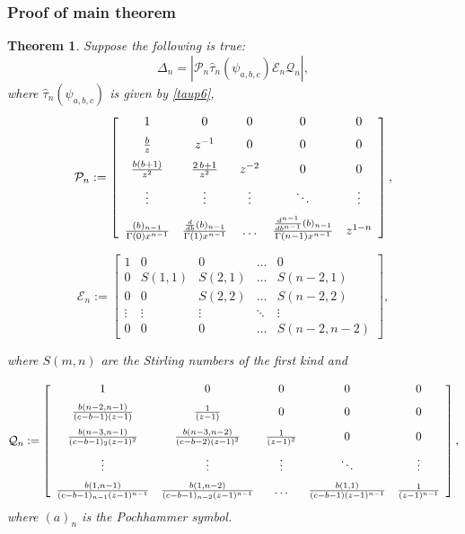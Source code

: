 \documentclass[12pt]{article}
\newtheorem{mydef}{Theorem}[section]
\numberwithin{figure}{section}
\numberwithin{equation}{section}
\numberwithin{table}{section}
\begin{document}
\subsubsection{Proof of main theorem}
\begin{mydef}
Suppose the following is true:
\begin{equation}
\Delta_n=|\mathcal{P}_n\hat\tau_n(\psi_{a,b,c})\mathcal{E}_n\mathcal{Q}_n|,\label{POMT}
\end{equation}
where $\hat\tau_n(\psi_{a,b,c})$ is given by \eqref{taup6},
$$
\mathcal{P}_n:=\left[ \begin {array}{ccccc} 1&0&0&0&0\\ \noalign{\medskip}{\frac {b}{z}
}&{z}^{-1}&0&0&0\\ \noalign{\medskip}{\frac {b \left( b+1 \right) }{{z}^
{2}}}&{\frac {2\,b+1}{{z}^{2}}}&{z}^{-2}&0&0\\ \noalign{\medskip}{\vdots}&\vdots&\vdots&\ddots&\vdots\\ \noalign{\medskip}{\frac{(b)_{n-1}}{\Gamma(0)x^{n-1}}}&\frac{\frac{d}{db}(b)_{n-1}}{\Gamma(1)x^{n-1}}&\hdots&\frac{\frac{d^{n-1}}{db^{n-1}}(b)_{n-1}}{\Gamma(n-1)x^{n-1}}&z^{1-n}\end {array} \right],
$$

$$
\mathcal{E}_n:=\left[\begin {array}{ccccc}
1 & 0 & 0  &\hdots&0 \\
0 & S(1,1)  &S(2,1)&\hdots& S(n-2,1)  \\
0 & 0 & S(2,2)  &\hdots& S(n-2,2)  \\
\vdots  &\vdots & \vdots &\ddots & \vdots \\
0 & 0 & 0 &\hdots& S(n-2,n-2)
\end {array}\right],
$$

where $S(m,n)$ are the Stirling numbers of the first kind and

$$
\mathcal{Q}_n:=\left[ \begin {array}{ccccc} 1&0&0&0&0\\ \noalign{\medskip}{\frac {b(n-2,n-1)}{(c-b-1)(z-1)}
}&\frac{1}{(z-1)}&0&0&0\\ \noalign{\medskip}{\frac {b(n-3,n-1)}{(c-b-1)_2(z-1)^2}}&\frac {b(n-3,n-2)}{(c-b-2)(z-1)^2}&\frac{1}{(z-1)^2}&0&0\\ \noalign{\medskip}{\vdots}&\vdots&\vdots&\ddots&\vdots\\ \noalign{\medskip}{\frac {b(1,n-1)}{(c-b-1)_{n-1}(z-1)^{n-1}}}&\frac {b(1,n-2)}{(c-b-1)_{n-2}(z-1)^{n-1}}&\hdots&\frac {b(1,1)}{(c-b-1)(z-1)^{n-1}}&\frac{1}{(z-1)^{n-1}}\end {array}
\right],
$$
where $(a)_n$ is the Pochhammer symbol.
\end{mydef}
\end{document}
